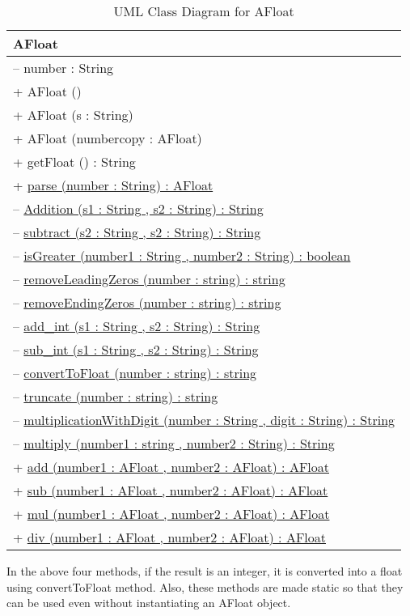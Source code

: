 \documentclass[a4paper,12pt]{article}
\begin{document}
\begin{table}[h!]
\centering
\begin{tabular}{|l|}
\hline
\textbf{AFloat}\\
\hline
-- number : String\\
\hline
+ AFloat () \\
+ AFloat (s : String) \\
+ AFloat (numbercopy : AFloat)\\
+ getFloat () : String \\
+ \underline{parse (number : String) : AFloat} \\
-- \underline{Addition (s1 : String , s2 : String) : String} \\
-- \underline{subtract (s2 : String , s2 : String) : String} \\
-- \underline{isGreater (number1 : String , number2 : String) : boolean }\\
-- \underline{removeLeadingZeros (number : string) : string} \\
-- \underline{removeEndingZeros (number : string) : string} \\
-- \underline{add\_int (s1 : String , s2 : String) : String} \\
-- \underline{sub\_int (s1 : String , s2 : String) : String} \\
-- \underline{convertToFloat (number : string) : string} \\
-- \underline{truncate (number : string) : string} \\
-- \underline{multiplicationWithDigit (number : String , digit : String) : String} \\
-- \underline{multiply (number1 : string , number2 : String) : String} \\
+ \underline{add (number1 : AFloat , number2 : AFloat) : AFloat} \\
+ \underline{sub (number1 : AFloat , number2 : AFloat) : AFloat} \\
+ \underline{mul (number1 : AFloat , number2 : AFloat) : AFloat} \\
+ \underline{div (number1 : AFloat , number2 : AFloat) : AFloat} \\
\hline
\end{tabular}
\caption{UML Class Diagram for AFloat}
\end{table}

In the above four methods, if the result is an integer, it is converted into a float using convertToFloat method. Also, these methods are made static so that they can be used even without instantiating an AFloat object.\\
\end{document}
